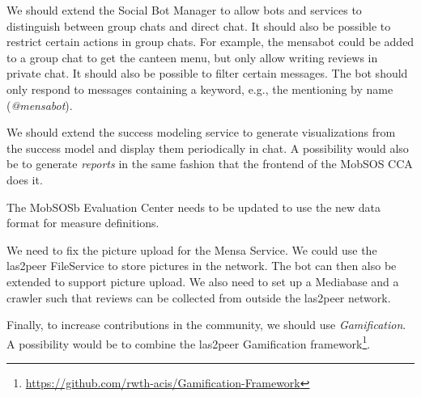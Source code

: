 We should extend the Social Bot Manager to allow bots and services to distinguish between group chats and direct chat. It should also be possible to restrict certain actions in group chats. For example, the mensabot could be added to a group chat to get the canteen menu, but only allow writing reviews in private chat.
It should also be possible to filter certain messages. The bot should only respond to messages containing a keyword, e.g., the mentioning by name (\emph{@mensabot}).

We should extend the success modeling service to generate visualizations from the success model and display them periodically in chat. A possibility would also be to generate \emph{reports} in the same fashion that the frontend of the MobSOS CCA does it. 

The MobSOSb Evaluation Center needs to be updated to use the new data format for measure definitions.

We need to fix the picture upload for the Mensa Service. We could use the las2peer FileService to store pictures in the network. The bot can then also be extended to support picture upload. 
We also need to set up a Mediabase and a crawler such that reviews can be collected from outside the las2peer network. 

Finally, to increase contributions in the community, we should use \emph{Gamification}. A possibility would be to combine the las2peer Gamification framework\footnote{\url{https://github.com/rwth-acis/Gamification-Framework}}.